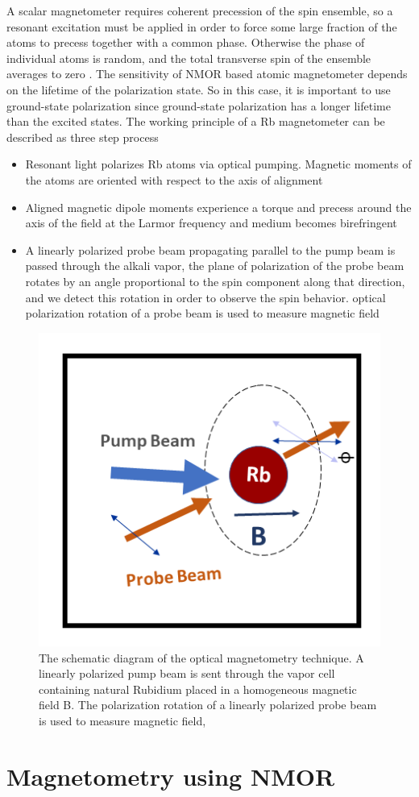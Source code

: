 A scalar magnetometer requires coherent precession of the spin ensemble, so a resonant excitation must be applied in order to force some large fraction of the atoms to precess together with a common phase. Otherwise the phase of individual atoms is random, and the total transverse spin of the ensemble averages to zero . The sensitivity of NMOR based atomic magnetometer depends on the lifetime of the polarization state. So in this case, it is important to use ground-state polarization since ground-state polarization has a longer lifetime than the excited states. The working principle of a Rb magnetometer can be described as three step process
\begin{itemize}
\item
Resonant light polarizes Rb atoms via optical pumping. Magnetic
moments of the atoms are oriented with respect to the axis of
alignment
\end{itemize}
\begin{itemize}
\item Aligned magnetic dipole moments experience a torque and precess around the axis of the field at the Larmor frequency and medium becomes birefringent
\end{itemize}
\begin{itemize}
\item A linearly polarized probe beam propagating parallel to the
pump beam is passed through the alkali vapor, the plane of polarization of the probe beam
rotates by an angle proportional to the spin component along that direction, and we detect
this rotation in order to observe the spin behavior. optical polarization rotation of a probe beam is used to measure magnetic field
\end{itemize}
\begin{figure}[h]
\centering
\includegraphics[width=0.55\linewidth]{figures/optical_pumping}
\caption{The schematic diagram of the optical magnetometry technique.
  A linearly polarized pump beam is sent through the vapor cell
  containing natural Rubidium placed in a homogeneous magnetic field
  B.  The polarization rotation of a linearly polarized probe beam is
  used to measure magnetic field,\label{Rb magnetometry}}
\end{figure}

\section{Magnetometry using NMOR}

